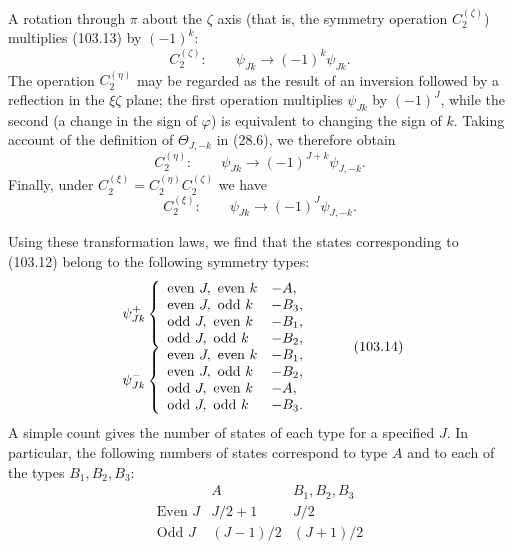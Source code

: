 A rotation through $\pi$ about the $\zeta$ axis (that is, the symmetry operation $C_2^{(\zeta)}$) multiplies (103.13) by $(-1)^k$:
\[
 C_2^{(\zeta)}:\qquad \psi_{Jk}\to(-1)^k\psi_{Jk}.
\]
The operation $C_2^{(\eta)}$ may be regarded as the result of an inversion followed by a reflection in the $\xi\zeta$ plane; the first operation multiplies $\psi_{Jk}$ by $(-1)^J$, while the second (a change in the sign of $\varphi$) is equivalent to changing the sign of $k$. Taking account of the definition of $\Theta_{J,-k}$ in (28.6), we therefore obtain
\[
 C_2^{(\eta)}:\qquad \psi_{Jk}\to(-1)^{J+k}\psi_{J,-k}.
\]
Finally, under $C_2^{(\xi)}=C_2^{(\eta)}C_2^{(\zeta)}$ we have
\[
 C_2^{(\xi)}:\qquad \psi_{Jk}\to(-1)^J\psi_{J,-k}.
\]

Using these transformation laws, we find that the states corresponding to (103.12) belong to the following symmetry types:
\begin{equation}
\begin{array}{c@{\quad}c@{\quad}c}
\psi_{Jk}^{+}\left\{\begin{array}{ll}
\text{even }J,\ \text{even }k&-A,\\
\text{even }J,\ \text{odd }k&-B_3,\\
\text{odd }J,\ \text{even }k&-B_1,\\
\text{odd }J,\ \text{odd }k&-B_2,
\end{array}\right.\\[6pt]
\psi_{Jk}^{-}\left\{\begin{array}{ll}
\text{even }J,\ \text{even }k&-B_1,\\
\text{even }J,\ \text{odd }k&-B_2,\\
\text{odd }J,\ \text{even }k&-A,\\
\text{odd }J,\ \text{odd }k&-B_3.
\end{array}\right.
\end{array} \tag{103.14}
\end{equation}
A simple count gives the number of states of each type for a specified $J$. In particular, the following numbers of states correspond to type $A$ and to each of the types $B_1,B_2,B_3$:
\begin{equation}
\begin{array}{c|c|c}
&A&B_1,B_2,B_3\\ \hline
\text{Even }J&J/2+1&J/2\\
\text{Odd }J&(J-1)/2&(J+1)/2
\end{array} \tag{103.15}
\end{equation}

